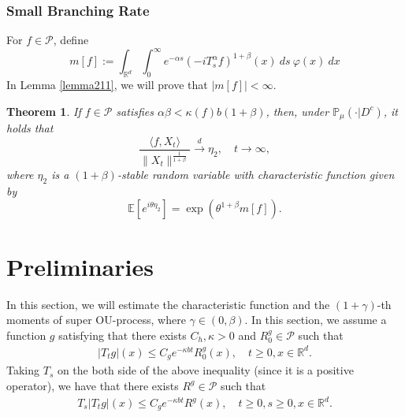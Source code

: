 \documentclass[12pt, a4paper]{amsart}
\newtheorem{thm}{Theorem}[section]
\theoremstyle{definition}
\numberwithin{equation}{section}
\begin{document}
\subsubsection{Small Branching Rate}

For $f\in \mathcal{P}$, define
$$m[f]:=\int_{\mathbb{R}^d}\int_0^{\infty} e^{-\alpha s}(-iT_{s}^{\alpha}f)^{1+\beta}(x)~ds~\varphi(x)~dx$$
In Lemma \ref{lemma211}, we will prove that $|m[f]|<\infty$.
\begin{thm}\label{Theorem13}
    If $f\in\mathcal{P}$ satisfies  $\alpha\beta<\kappa(f)b(1+\beta)$, then, under $\mathbb{P}_{\mu}(\cdot|D^c)$, it holds that
    $$\frac{\langle f,X_t\rangle}{\|X_t\|^{\frac{1}{1+\beta}}}\xrightarrow{d} \eta_2, \quad t\rightarrow \infty,$$
    where $\eta_2$ is a $(1+\beta)$-stable random variable with characteristic function given by
    $$\mathbb{E} [e^{i\theta \eta_2}]=\exp(\theta^{1+\beta}m[f]).$$
\end{thm}

\section{Preliminaries}
In this section, we will estimate the characteristic function and the $(1+\gamma)$-th moments of super OU-process, where $\gamma \in (0,\beta)$.
    In this section, we assume a function $g$ satisfying that there exists $C_h, \kappa>0$ and $R^g_0\in \mathcal{P}$
    such that
\begin{align}
\label{eq:gcontrol1}
     |T_tg|(x)
     \leq C_g e^{-\kappa bt}R^g_0(x),
     \quad t\geq 0,x\in \mathbb{R}^d.
\end{align}
Taking $T_s$ on the both side of the above inequality (since it is a positive operator), we have that there exists $R^g \in \mathcal P$ such that
\begin{align}
\label{eq:gcontrol}
    T_s|T_t g|(x)
    \leq C_g e^{-\kappa bt} R^g(x),
    \quad t\geq 0,s\geq 0,x\in \mathbb{R}^d.
\end{align}
\end{document}
